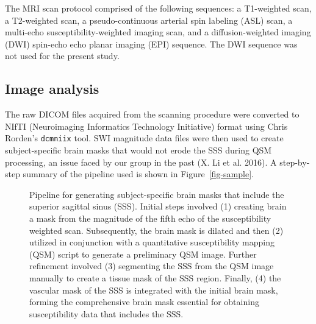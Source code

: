 \documentclass[
sn-nature
]{sn-jnl}
\begin{document}
The MRI scan protocol comprised of the following sequences: a
T1-weighted scan, a T2-weighted scan, a pseudo-continuous arterial spin
labeling (ASL) scan, a multi-echo susceptibility-weighted imaging scan,
and a diffusion-weighted imaging (DWI) spin-echo echo planar imaging
(EPI) sequence. The DWI sequence was not used for the present study.

\subsection{Image analysis}\label{image-analysis}

The raw DICOM files acquired from the scanning procedure were converted
to NIfTI (Neuroimaging Informatics Technology Initiative) format using
Chris Rorden's \texttt{dcmniix} tool. SWI magnitude data files were then
used to create subject-specific brain masks that would not erode the SSS
during QSM processing, an issue faced by our group in the past (X. Li et
al. 2016). A step-by-step summary of the pipeline used is shown in
Figure~\ref{fig-sample}.

\begin{figure}[H]


\caption{\label{fig-graph}Pipeline for generating subject-specific brain
masks that include the superior sagittal sinus (SSS). Initial steps
involved (1) creating brain a mask from the magnitude of the fifth echo
of the susceptibility weighted scan. Subsequently, the brain mask is
dilated and then (2) utilized in conjunction with a quantitative
susceptibility mapping (QSM) script to generate a preliminary QSM image.
Further refinement involved (3) segmenting the SSS from the QSM image
manually to create a tissue mask of the SSS region. Finally, (4) the
vascular mask of the SSS is integrated with the initial brain mask,
forming the comprehensive brain mask essential for obtaining
susceptibility data that includes the SSS.}

\end{figure}%
\end{document}
